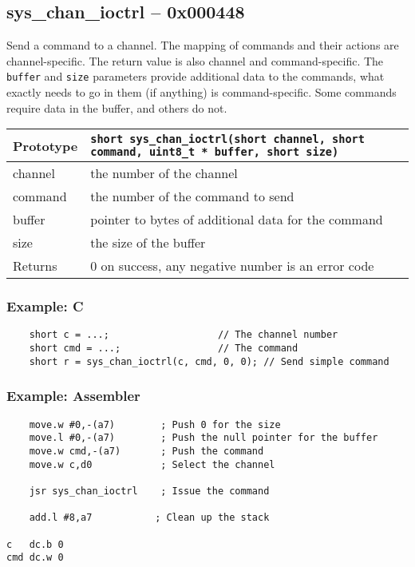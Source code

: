 \subsection*{sys\_chan\_ioctrl -- 0x000448}
Send a command to a channel.
The mapping of commands and their actions are channel-specific.
The return value is also channel and command-specific.
The \verb+buffer+ and \verb+size+ parameters provide additional data to the commands,
what exactly needs to go in them (if anything) is command-specific.
Some commands require data in the buffer, and others do not.

\bigskip

\begin{tabular}{|l||l|} \hline
Prototype & \lstinline!short sys_chan_ioctrl(short channel, short command, uint8_t * buffer, short size)! \\ \hline
channel & the number of the channel \\ \hline
command & the number of the command to send \\ \hline
buffer & pointer to bytes of additional data for the command \\ \hline
size & the size of the buffer \\ \hline
Returns & 0 on success, any negative number is an error code \\ \hline
\end{tabular}

\subsubsection*{Example: C}
\begin{lstlisting}
    short c = ...;                   // The channel number
    short cmd = ...;                 // The command
    short r = sys_chan_ioctrl(c, cmd, 0, 0); // Send simple command
\end{lstlisting}

\subsubsection*{Example: Assembler}
\begin{verbatim}
    move.w #0,-(a7)        ; Push 0 for the size
    move.l #0,-(a7)        ; Push the null pointer for the buffer
    move.w cmd,-(a7)       ; Push the command
    move.w c,d0            ; Select the channel

    jsr sys_chan_ioctrl    ; Issue the command

    add.l #8,a7           ; Clean up the stack

c   dc.b 0
cmd dc.w 0
\end{verbatim}


